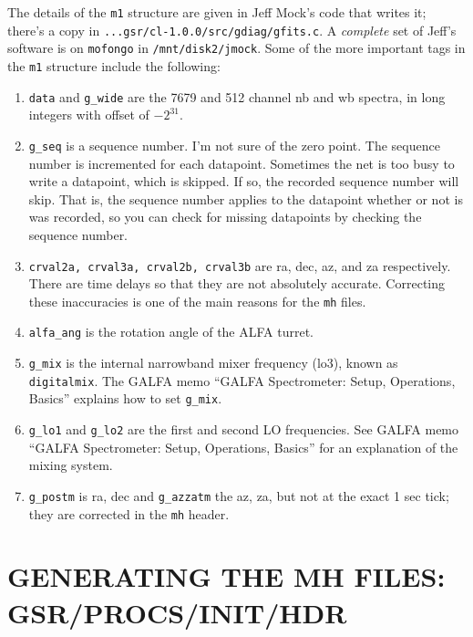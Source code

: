 \documentclass[psfig,preprint]{aastex}
\begin{document}
	The details of the \verb$m1$ structure are given in Jeff Mock's
code that writes it; there's a copy in
\verb$...gsr/cl-1.0.0/src/gdiag/gfits.c$.  A {\it complete} set of Jeff's
software is on \verb$mofongo$ in \verb$/mnt/disk2/jmock$.  Some of the
more important tags in the \verb$m1$ structure include the following:
\begin{enumerate}

	\item \verb$data$ and \verb$g_wide$ are the 7679 and 512
channel nb and wb spectra, in long integers with offset of $-2^{31}$. 

	\item \verb$g_seq$ is a sequence number. I'm not sure of the
zero point. The sequence number is incremented for each datapoint.
Sometimes the net is too busy to write a datapoint, which is skipped. If
so, the recorded sequence number will skip. That is, the sequence
number applies to the datapoint whether or not is was recorded, so you
can check for missing datapoints by checking the sequence number.

	\item \verb$crval2a, crval3a, crval2b, crval3b$ are ra, dec, az,
and za respectively. There are time delays so that they are not
absolutely accurate. Correcting these inaccuracies is one of the main
reasons for the \verb$mh$ files.

	\item \verb$alfa_ang$ is the rotation angle of the ALFA turret.

	\item \verb$g_mix$ is the internal narrowband mixer frequency
(lo3), known as \verb$digitalmix$.  The GALFA memo ``GALFA Spectrometer:
Setup, Operations, Basics'' explains how to set \verb$g_mix$. 

	\item \verb$g_lo1$ and \verb$g_lo2$ are the first and second LO
frequencies.  See GALFA memo ``GALFA Spectrometer: Setup, Operations,
Basics'' for an explanation of the mixing system. 

	\item \verb$g_postm$ is ra, dec and \verb$g_azzatm$ the az, za,
but not at the exact 1 sec tick; they are corrected in the \verb$mh$
header. 

\end{enumerate}

\section{GENERATING THE MH FILES: GSR/PROCS/INIT/HDR} \label{init/hdr}
\end{document}
